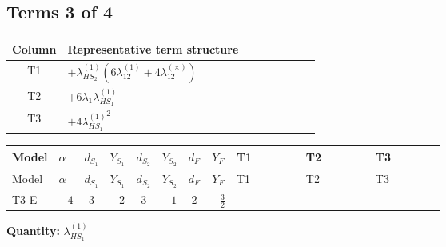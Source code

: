 \documentclass[8pt]{article}
\begin{document}
\begin{landscape}
\subsection*{Terms 3 of 4}
\begin{center}
\begin{tabular}{@{}c >{\raggedright\arraybackslash}p{0.82\linewidth}@{}}
\toprule
Column & Representative term structure \\
\midrule
T1 & \(\displaystyle +{\lambda_{HS_2}^{(1)}} (6 {\lambda_{12}^{(1)}}+4 {\lambda_{12}^{(\times)}})\) \\
\midrule
T2 & \(\displaystyle +6 {\lambda_1} {\lambda_{HS_1}^{(1)}}\) \\
\midrule
T3 & \(\displaystyle +4 {\lambda_{HS_1}^{(1)}}^2\) \\
\midrule
\bottomrule
\end{tabular}
\end{center}
\smallskip
\tiny
\begin{longtable}{@{}llcccccc >{\raggedright\arraybackslash}p{0.21\linewidth} >{\raggedright\arraybackslash}p{0.21\linewidth} >{\raggedright\arraybackslash}p{0.21\linewidth}@{}}
\toprule
Model & $\alpha$ & $d_{S_1}$ & $Y_{S_1}$ & $d_{S_2}$ & $Y_{S_2}$ & $d_F$ & $Y_F$ & T1 & T2 & T3 \\
\midrule
\endfirsthead
\toprule
Model & $\alpha$ & $d_{S_1}$ & $Y_{S_1}$ & $d_{S_2}$ & $Y_{S_2}$ & $d_F$ & $Y_F$ & T1 & T2 & T3 \\
\midrule
\endhead
T3-E & $-4$ & $3$ & $-2$ & $3$ & $-1$ & $2$ & $-\frac{3}{2}$ & \scriptsize\adjustbox{max width=\linewidth}{$\begin{gathered} +{\lambda_{HS_2}^{(1)}} (6 {\lambda_{12}^{(1)}}+4 {\lambda_{12}^{(\times)}})\end{gathered}$} & \scriptsize\adjustbox{max width=\linewidth}{$\begin{gathered} +6 {\lambda_1} {\lambda_{HS_1}^{(1)}}\end{gathered}$} & \scriptsize\adjustbox{max width=\linewidth}{$\begin{gathered} +4 {\lambda_{HS_1}^{(1)}}^2\end{gathered}$} \\
\midrule
\bottomrule
\end{longtable}
\clearpage
\noindent\textbf{Quantity: }$\lambda_{HS_1}^{(1)}$\par\smallskip

\end{landscape}
\end{document}
